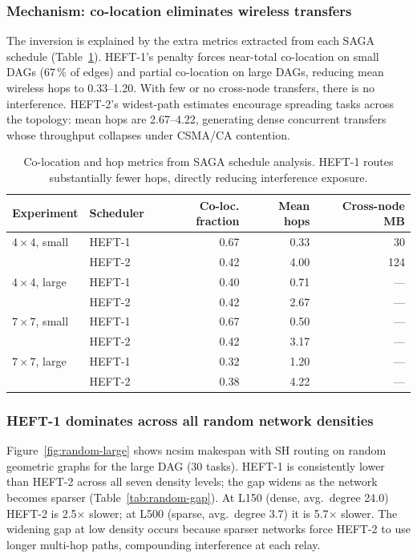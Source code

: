 \documentclass[11pt]{article}
\begin{document}
\subsubsection{Mechanism: co-location eliminates wireless transfers}

The inversion is explained by the extra metrics extracted from each SAGA
schedule (Table~\ref{tab:coloc}).  HEFT-1's penalty forces near-total
co-location on small DAGs (67\,\% of edges) and partial co-location on large
DAGs, reducing mean wireless hops to 0.33--1.20.  With few or no cross-node
transfers, there is no interference.  HEFT-2's widest-path estimates encourage
spreading tasks across the topology: mean hops are 2.67--4.22, generating dense
concurrent transfers whose throughput collapses under CSMA/CA contention.

\begin{table}[H]
\centering
\small
\begin{tabular}{l l r r r}
\toprule
\textbf{Experiment} & \textbf{Scheduler}
  & \textbf{Co-loc. fraction} & \textbf{Mean hops} & \textbf{Cross-node MB} \\
\midrule
$4\times4$, small & HEFT-1 & 0.67 & 0.33 & 30  \\
                  & HEFT-2 & 0.42 & 4.00 & 124 \\
\midrule
$4\times4$, large & HEFT-1 & 0.40 & 0.71 & --- \\
                  & HEFT-2 & 0.42 & 2.67 & --- \\
\midrule
$7\times7$, small & HEFT-1 & 0.67 & 0.50 & --- \\
                  & HEFT-2 & 0.42 & 3.17 & --- \\
\midrule
$7\times7$, large & HEFT-1 & 0.32 & 1.20 & --- \\
                  & HEFT-2 & 0.38 & 4.22 & --- \\
\bottomrule
\end{tabular}
\caption{Co-location and hop metrics from SAGA schedule analysis.  HEFT-1
routes substantially fewer hops, directly reducing interference exposure.}
\label{tab:coloc}
\end{table}

\subsubsection{HEFT-1 dominates across all random network densities}

Figure~\ref{fig:random-large} shows ncsim makespan with SH routing on random
geometric graphs for the large DAG (30 tasks).  HEFT-1 is consistently lower
than HEFT-2 across all seven density levels; the gap widens as the network
becomes sparser (Table~\ref{tab:random-gap}).  At L150 (dense, avg.\ degree
24.0) HEFT-2 is 2.5$\times$ slower; at L500 (sparse, avg.\ degree 3.7) it is
5.7$\times$ slower.  The widening gap at low density occurs because sparser
networks force HEFT-2 to use longer multi-hop paths, compounding interference
at each relay.
\end{document}
